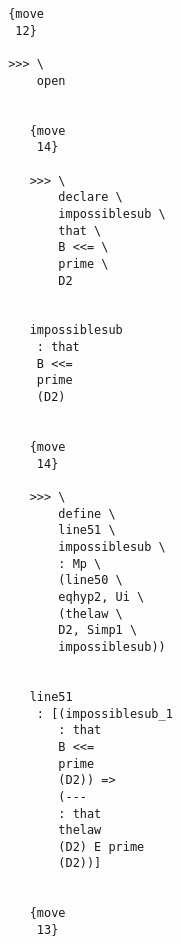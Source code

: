 \documentclass[12pt]{article}
\begin{document}
\begin{verbatim}
                                       {move 
                                        12}

                                       >>> \
                                           open


                                          {move 
                                           14}

                                          >>> \
                                              declare \
                                              impossiblesub \
                                              that \
                                              B <<= \
                                              prime \
                                              D2


                                          impossiblesub 
                                           : that 
                                           B <<= 
                                           prime 
                                           (D2)


                                          {move 
                                           14}

                                          >>> \
                                              define \
                                              line51 \
                                              impossiblesub \
                                              : Mp \
                                              (line50 \
                                              eqhyp2, Ui \
                                              (thelaw \
                                              D2, Simp1 \
                                              impossiblesub))


                                          line51 
                                           : [(impossiblesub_1 
                                              : that 
                                              B <<= 
                                              prime 
                                              (D2)) => 
                                              (--- 
                                              : that 
                                              thelaw 
                                              (D2) E prime 
                                              (D2))]


                                          {move 
                                           13}


\end{verbatim}
\end{document}

